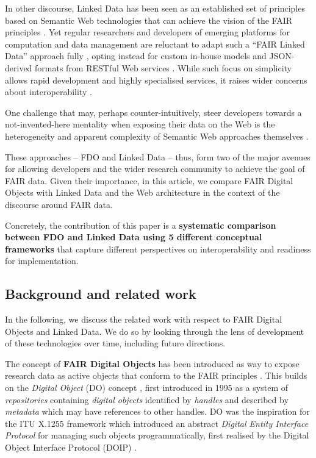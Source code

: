 In other discourse, Linked Data \cite{Bizer 2009} has been seen as an established set of principles based on Semantic Web technologies that can achieve the vision of the FAIR principles \cite{boninodasilvasantosFAIRDataPoints2016a,Hasnain 2018}. Yet regular researchers and developers of emerging platforms for computation and data management are reluctant to adapt such a ``FAIR Linked Data'' approach fully \cite{verborghSemanticWebIdentity2020a}, opting instead for custom in-house models and JSON-derived formats from RESTful Web services \cite{merono-penuelaConclusionFutureChallenges2021a,neumannAnalysisPublicREST2021a}. While such focus on simplicity allows rapid development and highly specialised services, it raises wider concerns about interoperability \cite{turcoaneLinkedDataJSONLD2014a,wilkinsonWorkflowsWhenParts2022b}.

One challenge that may, perhaps counter-intuitively, steer developers towards a not-invented-here mentality \cite{stefiDevelopersMakeUnbiased2015,stefiDevelopReuseTwo2015a} when exposing their data on the Web is the heterogeneity and apparent complexity of Semantic Web approaches themselves \cite{merono-penuelaWebDataApis2021b}.

These approaches -- FDO and Linked Data -- thus, form two of the major avenues for allowing developers and the wider research community to achieve the goal of FAIR data. Given their importance, in this article, we compare FAIR Digital Objects with Linked Data and the Web architecture in the context of the discourse around FAIR data.

Concretely, the contribution of this paper is a {\bf systematic comparison between FDO and Linked Data using 5 different conceptual frameworks} that capture different perspectives on interoperability and readiness for implementation.

\subsection{Background and related work}\label{ch3:background}

In the following, we discuss the related work with respect to FAIR Digital Objects and Linked Data. We do so by looking through the lens of development of these technologies over time, including future directions.

The concept of \textbf{FAIR Digital Objects} \cite{schultesFAIRPrinciplesDigital2019a} has been introduced as way to expose research data as active objects that conform to the FAIR principles \cite{Wilkinson 2016}. This builds on the \emph{Digital Object} (DO) concept \cite{kahnFrameworkDistributedDigital2006b}, first introduced in 1995 \cite{kahnFrameworkDistributedDigital1995a} as a system of \emph{repositories} containing \emph{digital objects} identified by \emph{handles} and described by \emph{metadata} which may have references to other handles. DO was the inspiration for the ITU X.1255 framework \cite{x1255FrameworkDiscovery} which introduced an abstract \emph{Digital Entity Interface Protocol} for managing such objects programmatically, first realised by the Digital Object Interface Protocol (DOIP) \cite{DigitalObjectInterface}.


